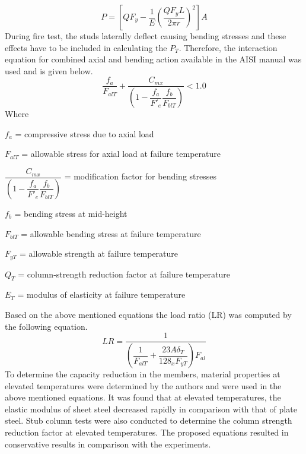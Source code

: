\begin{equation}
	P = \left[QF_y - \dfrac{1}{E}(\dfrac{QF_yL}{2\pi r})^2\right]A
\end{equation}
During fire test, the studs laterally deflect causing bending stresses and these effects have to be included in calculating the $P_T$. Therefore, the interaction equation for combined axial and bending action available in the AISI manual was used and is given below.
\begin{equation}
	\dfrac{f_a}{F_{alT}} + \dfrac{C_{mx}}{\left(1-\dfrac{f_a}{F'_e}\dfrac{f_b}{F_{blT}}\right)} < 1.0
\end{equation} 
Where
\begin{description}[itemsep=0pt,parsep=0pt]
	\item $f_a$ = compressive stress due to axial load
	\item $F_{alT}$ = allowable stress for axial load at failure temperature
	\item $\dfrac{C_{mx}}{\left(1-\dfrac{f_a}{F'_e}\dfrac{f_b}{F_{blT}}\right)}$ = modification factor for bending stresses
	\item $f_b$ = bending stress at mid-height
	\item $F_{blT}$ = allowable bending stress at failure temperature
	\item $F_{yT}$ = allowable strength at failure temperature
	\item $Q_T$ = column-strength reduction factor at failure temperature
	\item $E_T$ = modulus of elasticity at failure temperature
\end{description}
Based on the above mentioned equations the load ratio (LR) was computed by the following equation.
\begin{equation}
	LR = \dfrac{1}{\left(\dfrac{1}{F_{alT}}+\dfrac{23 A \delta _T}{128_xF_{yT}}\right)F_{al}}
\end{equation}
To determine the capacity reduction in the members, material properties at elevated temperatures were determined by the authors and were used in the above mentioned equations. It was found that at elevated temperatures, the elastic modulus of sheet steel decreased rapidly in comparison with that of plate steel. Stub column tests were also conducted to determine the column strength reduction factor at elevated temperatures. The proposed equations resulted in conservative results in comparison with the experiments.

